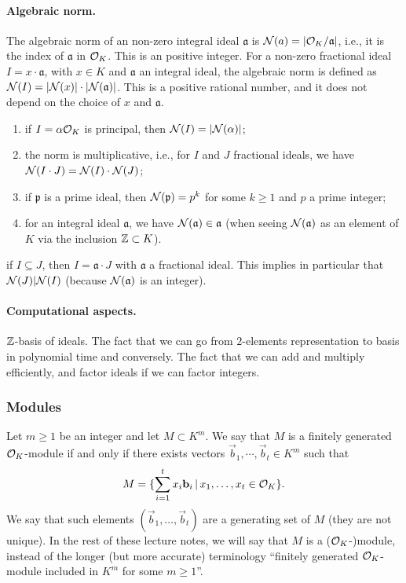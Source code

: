 \paragraph{Algebraic norm.} The algebraic norm of an non-zero integral ideal $\mathfrak{a}$ is $\mathcal{N}(a) = |\mathcal{O}_K/\mathfrak{a}|$, i.e., it is the index of $\mathfrak{a}$ in $\mathcal{O}_K$. This is an positive integer. For a non-zero fractional ideal $I = x \cdot \mathfrak{a}$, with $x \in K$ and $\mathfrak{a}$ an integral ideal, the algebraic norm is defined as $\mathcal{N}(I) = |\mathcal{N}(x)| \cdot |\mathcal{N}(\mathfrak{a})|$. This is a positive rational number, and it does not depend on the choice of $x$ and $\mathfrak{a}$.

\begin{properties}
\label{prop:norm-ideal}
\begin{enumerate}
\item if $I = \alpha \mathcal{O}_K$ is principal, then $\mathcal{N}(I) = |\mathcal{N}(\alpha)|$;
\item the norm is multiplicative, i.e., for $I$ and $J$ fractional ideals, we have $\mathcal{N}(I \cdot J) = \mathcal{N}(I) \cdot \mathcal{N}(J)$;
\item if $\mathfrak{p}$ is a prime ideal, then $\mathcal{N}(\mathfrak{p}) = p^k$ for some $k \geq 1$ and $p$ a prime integer;
\item for an integral ideal $\mathfrak{a}$, we have $\mathcal{N}(\mathfrak{a}) \in \mathfrak{a}$ (when seeing $\mathcal{N}(\mathfrak{a})$ as an element of $K$ via the inclusion $\mathbb{Z} \subset K$).
\end{enumerate}
\item if $I \subseteq J$, then $I = \mathfrak{a} \cdot J$ with $\mathfrak{a}$ a fractional ideal. This implies in particular that $\mathcal{N}(J) |\mathcal{N}(I)$ (because $\mathcal{N}(\mathfrak{a})$ is an integer).
\end{properties}


\paragraph{Computational aspects.} $\mathbb{Z}$-basis of ideals. The fact that we can go from $2$-elements representation to basis in polynomial time and conversely. The fact that we can add and multiply efficiently, and factor ideals if we can factor integers.

\subsubsection{Modules}
\label{sec:modules}
Let $m \geq 1$ be an integer and let $M \subset K^m$. We say that $M$ is a finitely generated $\mathcal{O}_K$-module if and only if there exists vectors $\vec b_1, \cdots, \vec b_t \in K^m$ such that
\[ M = \{ \sum_{i = 1}^t x_i \mathbf b_i \,|\, x_1, \dots, x_t \in \mathcal{O}_K\}. \]
We say that such elements $(\vec b_1, \dots, \vec b_t)$ are a generating set of $M$ (they are not unique).
In the rest of these lecture notes, we will say that $M$ is a ($\mathcal{O}_K$-)module, instead of the longer (but more accurate) terminology ``finitely generated $\mathcal{O}_K$-module included in $K^m$ for some $m \geq 1$''.

